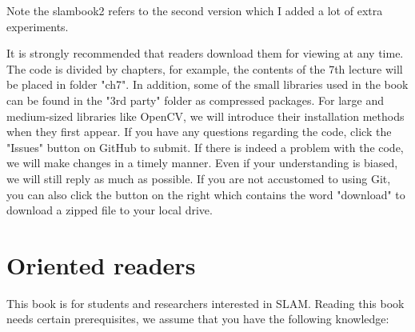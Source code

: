 Note the slambook2 refers to the second version which I added a lot of extra experiments. 


It is strongly recommended that readers download them for viewing at any time. The code is divided by chapters, for example, the contents of the 7th lecture will be placed in folder "ch7". In addition, some of the small libraries used in the book can be found in the "3rd party" folder as compressed packages. For large and medium-sized libraries like OpenCV, we will introduce their installation methods when they first appear. If you have any questions regarding the code, click the "Issues" button on GitHub to submit. If there is indeed a problem with the code, we will make changes in a timely manner. Even if your understanding is biased, we will still reply as much as possible. If you are not accustomed to using Git, you can also click the button on the right which contains the word "download" to download a zipped file to your local drive.

\section{Oriented readers}

This book is for students and researchers interested in SLAM. Reading this book needs certain prerequisites, we assume that you have the following knowledge:

